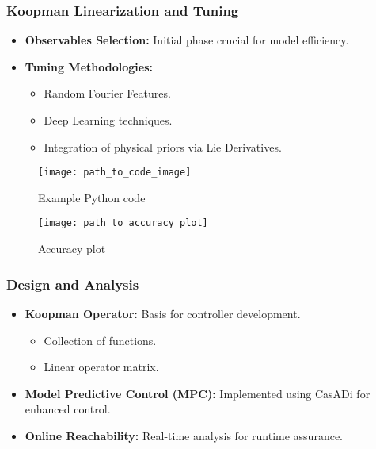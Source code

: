 \documentclass[shortpres,aspectratio=43]{beamer}
\begin{document}
\begin{frame}
\frametitle{Koopman Linearization and Tuning}
\begin{itemize}
    \item<1-> \textbf{Observables Selection:} Initial phase crucial for model efficiency.
    \item<2-> \textbf{Tuning Methodologies:} 
    \begin{itemize}
        \item Random Fourier Features.
        \item Deep Learning techniques.
        \item Integration of physical priors via Lie Derivatives.
    \end{itemize}
\end{itemize}
\begin{figure}
  \centering
  \texttt{[image: path\_to\_code\_image]} %
  \caption{Example Python code}
\end{figure}
\begin{figure}
  \centering
  \texttt{[image: path\_to\_accuracy\_plot]} %
  \caption{Accuracy plot}
\end{figure}
\end{frame}

\begin{frame}
\frametitle{Design and Analysis}
\begin{itemize}
    \item<1-> \textbf{Koopman Operator:} Basis for controller development.
    \begin{itemize}
        \item Collection of functions.
        \item Linear operator matrix.
    \end{itemize}
    \item<2-> \textbf{Model Predictive Control (MPC):} Implemented using CasADi for enhanced control.
    \item<3-> \textbf{Online Reachability:} Real-time analysis for runtime assurance.
\end{itemize}
\end{frame}
\end{document}
